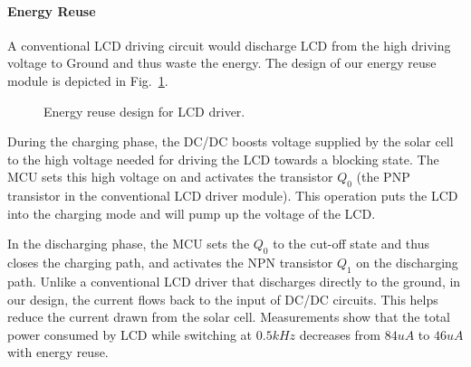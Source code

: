 \paragraph{Energy Reuse}
A conventional LCD driving circuit would discharge LCD from the high driving voltage to Ground and thus waste the energy. %
The design of our energy reuse module is depicted in Fig.~\ref{fig:energyreuse}.  
\begin{figure}[tg]
  \centering
      {
      }
\vspace{-1ex}      
\caption{Energy reuse design for LCD driver. }
\label{fig:energyreuse}
\end{figure}

During the charging phase, the DC/DC boosts voltage supplied by the solar cell to the high voltage needed for driving the LCD towards a blocking state. 
The MCU sets this high voltage on and activates the transistor $Q_0$ (the PNP transistor in the conventional LCD driver module).
This operation puts the LCD into the charging mode and will pump up the voltage of the LCD.

In the discharging phase, the MCU sets the $Q_0$ to the cut-off state and thus closes the charging path, and activates the NPN transistor $Q_1$ on the discharging path. %
Unlike a conventional LCD driver that discharges directly to the ground, in our design, the current flows back to the input of DC/DC circuits. This helps reduce the current drawn from the solar cell. Measurements show that the total power consumed by LCD while switching at $0.5kHz$ decreases from $84uA$ to $46uA$ with energy reuse. 

